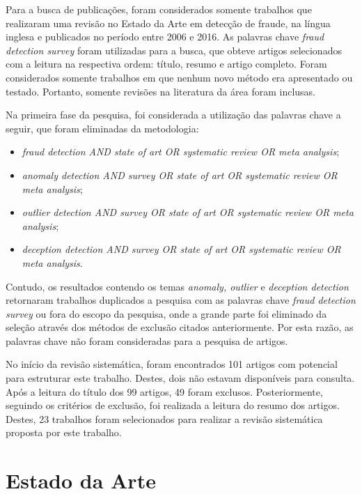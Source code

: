 \documentclass[smallextended]{svjour3}       %
\begin{document}
Para a busca de publicações, foram considerados somente trabalhos que realizaram uma revisão no Estado da Arte em detecção de fraude, na língua inglesa e publicados no período entre 2006 e 2016. As palavras chave \emph{fraud detection survey} foram utilizadas para a busca, que obteve artigos selecionados com a leitura na respectiva ordem: título, resumo e artigo completo. Foram considerados somente trabalhos em que nenhum novo método era apresentado ou testado. Portanto, somente revisões na literatura da área foram inclusas.

Na primeira fase da pesquisa, foi considerada a utilização das palavras chave a seguir, que foram eliminadas da metodologia:

\begin{itemize}
	\item \emph{fraud detection AND state of art OR systematic review OR meta analysis};
	
	\item \emph{anomaly detection AND survey OR state of art OR systematic review OR meta analysis};
	
	\item \emph{outlier detection AND survey OR state of art OR systematic review OR meta analysis}; 	
	
	\item \emph{deception detection AND survey OR state of art OR systematic review OR meta analysis}.
\end{itemize}

Contudo, os resultados contendo os temas \emph{anomaly, outlier} e \emph{deception detection} retornaram trabalhos duplicados a pesquisa com as palavras chave \emph{fraud detection survey} ou fora do escopo da pesquisa, onde a grande parte foi eliminado da seleção através dos métodos de exclusão citados anteriormente. Por esta razão, as palavras chave não foram consideradas para a pesquisa de artigos.

No início da revisão sistemática, foram encontrados 101 artigos com potencial para estruturar este trabalho. Destes, dois não estavam disponíveis para consulta. Após a leitura do título dos 99 artigos, 49 foram exclusos. Posteriormente, seguindo os critérios de exclusão, foi realizada a leitura do resumo dos artigos. Destes, 23 trabalhos foram selecionados para realizar a revisão sistemática proposta por este trabalho.

\section{Estado da Arte}
\label{sec:4}
\end{document}
